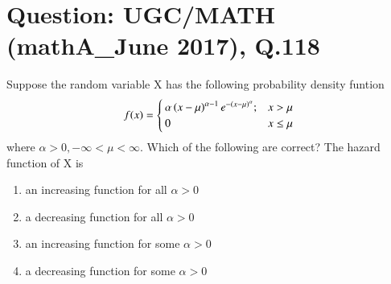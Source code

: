 \documentclass[journal,12pt,twocolumn]{IEEEtran}
\begin{document}
\section*{Question: UGC/MATH (mathA\_June 2017), Q.118}
Suppose the random variable X has the following probability density funtion 
\begin{align}
    f(x)=\begin{cases}\alpha\left(x-\mu\right)^{\alpha -1}e^{-\left(x-\mu\right)^\alpha};&x>\mu\\
                        0                               &x\leq\mu    
    \end{cases}\nonumber
\end{align}
where $\alpha>0,-\infty <\mu<\infty$. Which of the following are correct? The hazard function of X is
\begin{enumerate}
    \item an increasing function for all $\alpha>0$
    \item a decreasing function for all $\alpha >0$
    \item an increasing function for some $\alpha>0$
    \item a decreasing function for some $\alpha>0$
\end{enumerate}
\end{document}
